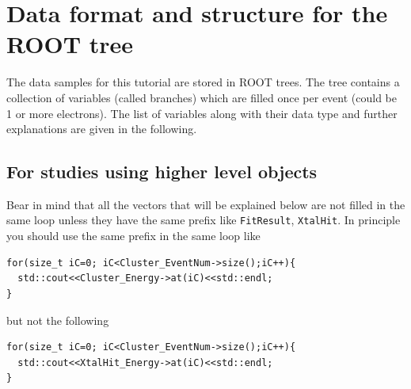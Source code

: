 \section{Data format and structure for the ROOT tree}

The data samples for this tutorial are stored in ROOT trees. The tree contains a collection of variables (called branches) which are filled once per event (could be 1 or more electrons). The list of variables along with their data type and further explanations are given in the following.

\subsection*{For studies using higher level objects}

Bear in mind that all the vectors that will be explained below are not filled in the same loop unless they have the same prefix like \verb+FitResult+, \verb+XtalHit+. In principle you should use the same prefix in the same loop like

\begin{Verbatim}[frame=single]
for(size_t iC=0; iC<Cluster_EventNum->size();iC++){
  std::cout<<Cluster_Energy->at(iC)<<std::endl;
}
\end{Verbatim}
%
but {\color{red} not the following}
\begin{Verbatim}[frame=single]
for(size_t iC=0; iC<Cluster_EventNum->size();iC++){
  std::cout<<XtalHit_Energy->at(iC)<<std::endl;
}
\end{Verbatim}

